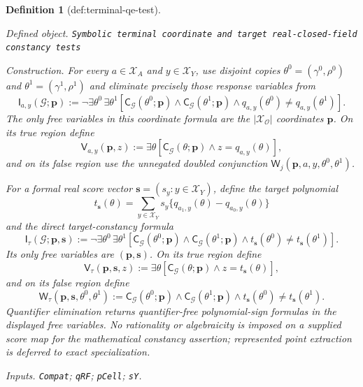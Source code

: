 \documentclass{article}
\newtheorem{definition}{Definition}
\begin{document}
\begin{definition}[def:terminal-qe-test]\label{def:terminal-qe-test}
\par\smallskip\noindent\emph{Defined object.} \texttt{Symbolic terminal coordinate and target real-\allowbreak{}closed-\allowbreak{}field constancy tests}
\par\smallskip\noindent\emph{Construction.} For every \(a\in\mathcal X_A\) and \(y\in\mathcal X_Y\), use disjoint copies \(\theta^0=(\gamma^0,\rho^0)\) and \(\theta^1=(\gamma^1,\rho^1)\) and eliminate precisely those response variables from
\[
\mathsf I_{a,y}(\mathcal G;\mathbf p):=
\neg\exists\theta^0\,\exists\theta^1
\left[
\mathsf C_{\mathcal G}(\theta^0;\mathbf p)
\wedge\mathsf C_{\mathcal G}(\theta^1;\mathbf p)
\wedge q_{a,y}(\theta^0)\neq q_{a,y}(\theta^1)
\right].
\]
The only free variables in this coordinate formula are the \(|\mathcal X_{\mathcal O}|\) coordinates \(\mathbf p\). On its true region define
\[
\mathsf V_{a,y}(\mathbf p,z):=
\exists\theta
\left[
\mathsf C_{\mathcal G}(\theta;\mathbf p)
\wedge z=q_{a,y}(\theta)
\right],
\]
and on its false region use the unnegated doubled conjunction \(\mathsf W_j(\mathbf p,a,y,\theta^0,\theta^1)\).

For a formal real score vector \(\mathbf s=(s_y:y\in\mathcal X_Y)\), define the target polynomial
\[
t_{\mathbf s}(\theta)
=\sum_{y\in\mathcal X_Y}s_y
\{q_{a_1,y}(\theta)-q_{a_0,y}(\theta)\}
\]
and the direct target-constancy formula
\[
\mathsf I_{\tau}(\mathcal G;\mathbf p,\mathbf s):=
\neg\exists\theta^0\,\exists\theta^1
\left[
\mathsf C_{\mathcal G}(\theta^0;\mathbf p)
\wedge\mathsf C_{\mathcal G}(\theta^1;\mathbf p)
\wedge t_{\mathbf s}(\theta^0)\neq t_{\mathbf s}(\theta^1)
\right].
\]
Its only free variables are \((\mathbf p,\mathbf s)\). On its true region define
\[
\mathsf V_{\tau}(\mathbf p,\mathbf s,z):=
\exists\theta
\left[
\mathsf C_{\mathcal G}(\theta;\mathbf p)
\wedge z=t_{\mathbf s}(\theta)
\right],
\]
and on its false region define
\[
\mathsf W_{\tau}(\mathbf p,\mathbf s,\theta^0,\theta^1):=
\mathsf C_{\mathcal G}(\theta^0;\mathbf p)
\wedge\mathsf C_{\mathcal G}(\theta^1;\mathbf p)
\wedge t_{\mathbf s}(\theta^0)\neq t_{\mathbf s}(\theta^1).
\]
Quantifier elimination returns quantifier-free polynomial-sign formulas in the displayed free variables. No rationality or algebraicity is imposed on a supplied score map for the mathematical constancy assertion; represented point extraction is deferred to exact specialization.
\par\smallskip\noindent\emph{Inputs.} \texttt{Compat}; \texttt{qRF}; \texttt{pCell}; \texttt{sY}.
\end{definition}
\end{document}

